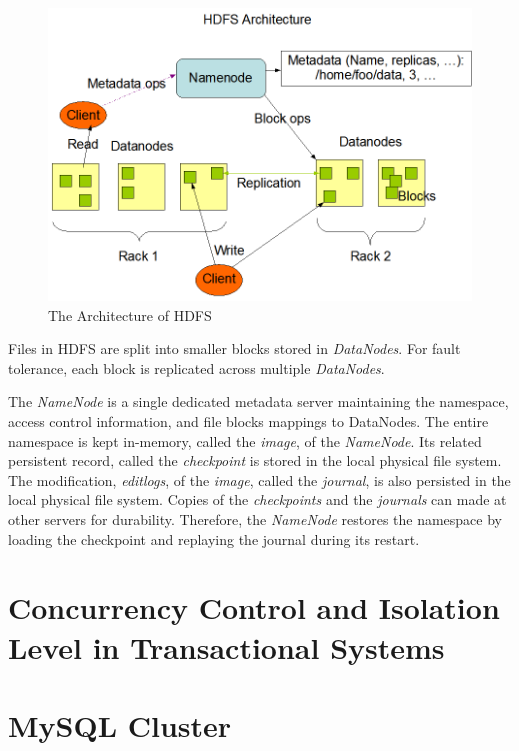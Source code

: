 \begin{figure}[ht]
	\centering
	\includegraphics[scale=0.4]{figs/hdfsarchitecturev1.png}
	\caption{The Architecture of HDFS \protect \cite{borthakur2008hdfs}}
	\label{fig:hdfsv1}
\end{figure}

\noindent Files in HDFS are split into smaller blocks stored in \textit{DataNodes}. For fault tolerance, each block is replicated across multiple \textit{DataNodes}.

\noindent The \textit{NameNode} is a single dedicated metadata server maintaining the namespace, access control information, and file blocks mappings to DataNodes. The entire namespace is kept in-memory, called the \textit{image}, of the \textit{NameNode}. Its related persistent record, called the \textit{checkpoint} is stored in the local physical file system. The modification, \textit{editlogs}, of the \textit{image}, called the \textit{journal}, is also persisted in the local physical file system. Copies of the \textit{checkpoints} and the \textit{journals} can made at other servers for durability. Therefore, the \textit{NameNode} restores the namespace by loading the checkpoint and replaying the journal during its restart.

\section{Concurrency Control and Isolation Level in Transactional Systems}

\section{MySQL Cluster}

